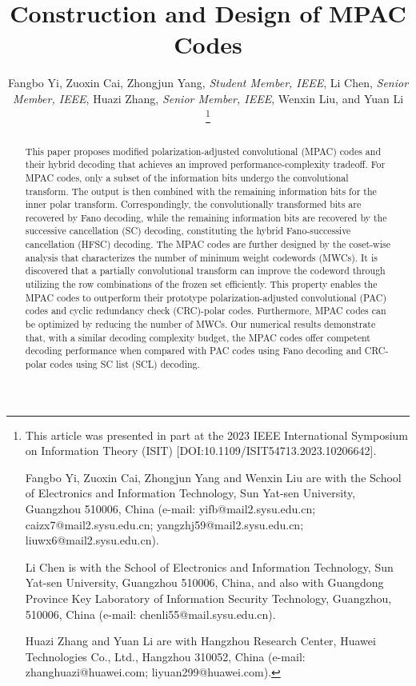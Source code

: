 \documentclass[12pt, draftclsnofoot, peerreview, onecolumn]{IEEEtran}
\theoremstyle{noparent}
\begin{document}
\title{
    Construction and Design of MPAC Codes
}


\author{Fangbo Yi, Zuoxin Cai, Zhongjun Yang, {\em Student Member, IEEE}, Li Chen, {\em Senior Member, IEEE}, Huazi Zhang, {\em Senior Member, IEEE}, Wenxin Liu, and Yuan Li

\thanks{This article was presented in part at the 2023 IEEE International Symposium on Information Theory (ISIT) [DOI:10.1109/ISIT54713.2023.10206642]. 

Fangbo Yi, Zuoxin Cai, Zhongjun Yang and Wenxin Liu are with the School of Electronics and Information Technology, Sun Yat-sen University, Guangzhou 510006, China
(e-mail:  yifb@mail2.sysu.edu.cn; caizx7@mail2.sysu.edu.cn; yangzhj59@mail2.sysu.edu.cn; liuwx6@mail2.sysu.edu.cn). 

Li Chen is with the School of Electronics and Information Technology, Sun Yat-sen University, Guangzhou 510006, China, and also with Guangdong Province Key Laboratory of Information Security Technology, Guangzhou, 510006, China
(e-mail:  chenli55@mail.sysu.edu.cn). 

Huazi Zhang and Yuan Li are with Hangzhou Research Center, Huawei Technologies Co.,
Ltd., Hangzhou 310052, China (e-mail: zhanghuazi@huawei.com; liyuan299@huawei.com).

}}

\maketitle

\begin{abstract}
This paper proposes modified polarization-adjusted convolutional (MPAC) codes 
and their hybrid decoding 
that achieves an improved performance-complexity tradeoff. 
For MPAC codes, 
only a subset of the information bits undergo the convolutional transform. 
The output is then combined with the remaining information bits for the inner polar transform. 
Correspondingly, the convolutionally transformed bits are recovered by Fano decoding, while the remaining information bits are recovered by the successive cancellation (SC) decoding, constituting the hybrid Fano-successive cancellation (HFSC) decoding.
The MPAC codes are further designed by the 
coset-wise analysis that characterizes the number of minimum weight codewords (MWCs). 
It is discovered that a partially convolutional transform can improve the codeword through utilizing the row combinations of the frozen set efficiently.
This property enables the MPAC codes to outperform their prototype polarization-adjusted convolutional (PAC) codes and cyclic redundancy check (CRC)-polar codes.
Furthermore, MPAC codes can be optimized by reducing the number of MWCs.
Our numerical results demonstrate that, with a similar decoding complexity budget, 
the MPAC codes offer competent decoding performance when compared with PAC codes using Fano decoding and CRC-polar codes using SC list (SCL) decoding.



\end{abstract}
\end{document}
